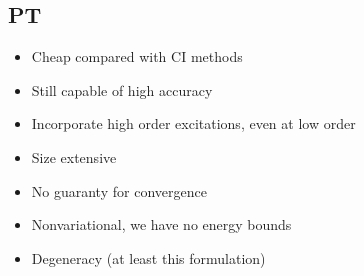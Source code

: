 \documentclass[
11pt,notheorems,hyperref={pdfauthor=whatever}
]{beamer}
\begin{document}
\subsection{PT}
\begin{frame}
    \textcolor{Green}{}
    \begin{itemize}
        \item Cheap compared with CI methods 
        \item Still capable of high accuracy
        \item Incorporate high order excitations, even at low order  
        \item Size extensive 
    \end{itemize}
    \vspace{20px}
    \textcolor{Red}{}
    \begin{itemize}
        \item No guaranty for convergence
        \item Nonvariational, we have no energy bounds  
        \item Degeneracy (at least this formulation)
    \end{itemize}
\end{frame}
\end{document}
